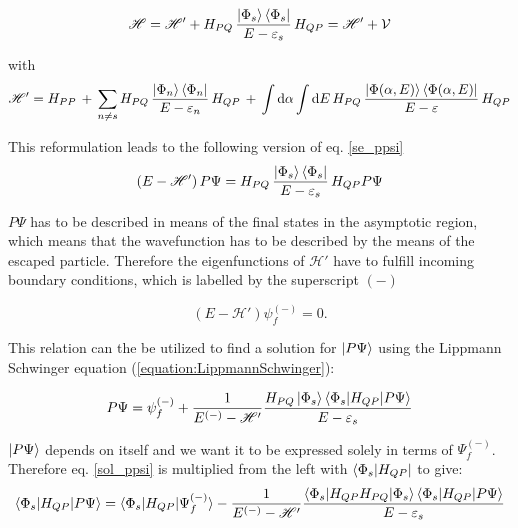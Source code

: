 \begin{equation}
  \mathscr{H} = \mathscr{H}' +
                H_{PQ} \,\frac{\ket{\Phi_s}\bra{\Phi_s}}{E-\varepsilon_s}\, H_{QP}
              = \mathscr{H}' + \mathcal{V}
\end{equation}

with
\begin{equation}
  \mathscr{H}' = H_{PP}\, + \,
  \sum\limits_{n\ne s} H_{PQ} \,\frac{\ket{\Phi_n}\bra{\Phi_n}}{E-\varepsilon_n}
  \, H_{QP} \,+\,
  \int \mathrm{d}\alpha \int\mathrm{d}E \,H_{PQ} \,
  \frac{\ket{\Phi(\alpha,E)}\bra{\Phi(\alpha,E)}}{E-\varepsilon} \, H_{QP}
\end{equation}

This reformulation leads to the following version of eq. \ref{se_ppsi}
\begin{equation}
  (E - \mathscr{H}')\, P \Psi =
   H_{PQ} \,\frac{\ket{\Phi_s}\bra{\Phi_s}}{E-\varepsilon_s}\, H_{QP} P \Psi %
\end{equation}

$P \Psi$ has to be described in means of the final states in the asymptotic
region, which means that the wavefunction has to be described by the means
of the escaped particle. Therefore
the eigenfunctions of $\mathscr{H}'$ have to fulfill incoming boundary conditions,
which is labelled by the superscript $(-)$

\begin{equation}
  (E-\mathscr{H}') \psi_f^{(-)} = 0 \label{sol_outg} .
\end{equation}

This relation can the be utilized to find a solution for $\ket{P \Psi}$
using the Lippmann Schwinger equation (\ref{equation:LippmannSchwinger}):

\begin{equation}\label{sol_ppsi}
  P \Psi = \psi_f^{(-)} + \frac{1}{E^{(-)} - \mathscr{H}'}
           \frac{H_{PQ}\ket{\Phi_s}
           \braket{\Phi_s|H_{QP}|P\Psi}}{E - \varepsilon_s} 
\end{equation}

$\ket{P \Psi}$ depends on itself and we want it to be expressed solely in terms
of $\Psi_f^{(-)}$. Therefore 
eq. \ref{sol_ppsi}
is multiplied from the left with $\bra{\Phi_s|H_{QP}}$ to give:
\begin{equation}
  \braket{\Phi_s|H_{QP}|P\Psi} = \braket{\Phi_s|H_{QP}|\Psi_f^{(-)}} -
  \frac{1}{E^{(-)} - \mathscr{H}'}
  \frac{\braket{\Phi_s|H_{QP}H_{PQ}|\Phi_s} \braket{\Phi_s|H_{QP}|P\Psi}}
       {E - \varepsilon_s}  \label{s_ppsi} 
\end {equation}


